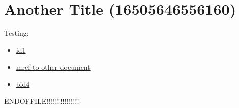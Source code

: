 \chapter{Another Title (16505646556160)}
\label{\detokenize{test_crosspage:another-title-16505646556160}}\label{\detokenize{test_crosspage::doc}}
\sphinxAtStartPar
Testing:
\begin{itemize}
\item {} 
\sphinxAtStartPar
\hyperlink{\detokenize{id1}}{id1}

\item {} 
\sphinxAtStartPar
\hyperlink{\detokenize{test-mid99-id0}}{\hypertarget{\detokenize{test_crosspage-mid99-id0}}{mref to other document}}

\item {} 
\sphinxAtStartPar
\hyperlink{\detokenize{bid4}}{\hypertarget{\detokenize{bid4-ref1}}{bid4}}

\end{itemize}

\sphinxAtStartPar
ENDOFFILE!!!!!!!!!!!!!!!!!



\renewcommand{\indexname}{Index}
\printindex

